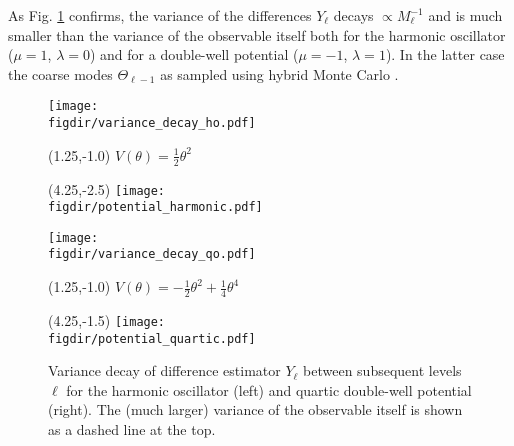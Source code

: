 \documentclass[11pt]{article}
\newcommand{\figdir}{./figures/}
\begin{document}
As Fig. \ref{fig:quantum_results} confirms, the variance of the differences $Y_\ell$ decays $\propto M_\ell^{-1}$ and is much smaller than the variance of the observable itself both for the harmonic oscillator ($\mu=1$, $\lambda=0$) and for a double-well potential ($\mu=-1$, $\lambda=1$). In the latter case the coarse modes $\Theta_{\ell-1}$ as sampled using hybrid Monte Carlo \cite{Duane1987}.
\begin{figure}
  \begin{center}
  \begin{minipage}{0.45\linewidth}
    \texttt{[image: \\figdir/variance\_decay\_ho.pdf]}
    \begin{textblock}{4.0}(1.25,-1.0)
      $V(\theta)=\frac{1}{2}\theta^2$
    \end{textblock}
    \begin{textblock}{4.0}(4.25,-2.5)
      \texttt{[image: \\figdir/potential\_harmonic.pdf]}
    \end{textblock}
  \end{minipage}
  \hfill
  \begin{minipage}{0.45\linewidth}
    \texttt{[image: \\figdir/variance\_decay\_qo.pdf]}
    \begin{textblock}{4.0}(1.25,-1.0)
      $V(\theta)=-\frac{1}{2}\theta^2+\frac{1}{4}\theta^4$
    \end{textblock}
    \begin{textblock}{4.0}(4.25,-1.5)
      \texttt{[image: \\figdir/potential\_quartic.pdf]}
    \end{textblock}
  \end{minipage}
  \caption{Variance decay of difference estimator $Y_\ell$ between subsequent levels $\ell$ for the harmonic oscillator (left) and quartic double-well potential (right). The (much larger) variance of the observable itself is shown as a dashed line at the top.}
  \label{fig:quantum_results}
  \end{center}
\end{figure}
\end{document}
